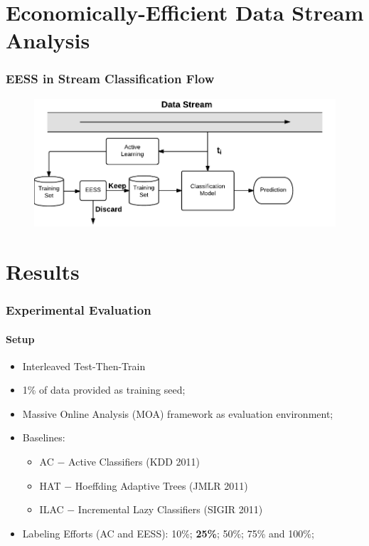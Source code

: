 \documentclass[14pt]{beamer}
\begin{document}
\section{Economically-Efficient Data Stream Analysis}
\begin{frame}\frametitle{EESS in Stream Classification Flow}
\begin{figure}
\centering
\includegraphics[scale=0.7]{EESS}
\end{figure}
\end{frame}

\section{Results}
\begin{frame}
\frametitle{Experimental Evaluation}
\framesubtitle{Setup}
\begin{itemize}
    \item Interleaved Test-Then-Train
    \item 1\% of data provided as training seed;
    \item Massive Online Analysis (MOA) framework as evaluation environment;
    \item Baselines:
    \begin{itemize}
      \item AC $-$ Active Classifiers (KDD 2011)
      \item HAT $-$ Hoeffding Adaptive Trees (JMLR 2011)
      \item ILAC $-$ Incremental Lazy Classifiers (SIGIR 2011)
    \end{itemize}
    \item Labeling Efforts (AC and EESS): 10\%; \textbf{25\%}; 50\%; 75\% and 100\%;
\end{itemize}

\end{frame}
\end{document}
